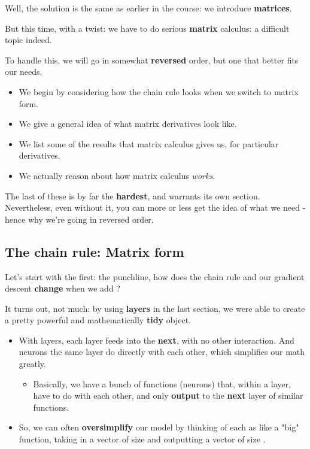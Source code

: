         Well, the solution is the same as earlier in the course: we introduce \textbf{matrices}.
        
        But this time, with a twist: we have to do serious \textbf{matrix} calculus: a difficult topic indeed.
        
        To handle this, we will go in somewhat \textbf{reversed} order, but one that better fits our needs.
        
        \begin{itemize}
            \item We begin by considering how the chain rule looks when we switch to matrix form.
            \item We give a general idea of what matrix derivatives look like.
            \item We list some of the results that matrix calculus gives us, for particular derivatives.
            \item We actually reason about how matrix calculus \textit{works}.
        \end{itemize}
        
        The last of these is by far the \textbf{hardest}, and warrants its own section. Nevertheless, even without it, you can more or less get the idea of what we need - hence why we're going in reversed order.

    \secdiv
    
    \subsection{The chain rule: Matrix form}
    
        Let's start with the first: the punchline, how does the chain rule and our gradient descent \textbf{change} when we add ?
        
        It turns out, not much: by using \textbf{layers} in the last section, we were able to create a pretty powerful and mathematically \textbf{tidy} object.

        \begin{itemize}
            \item With layers, each layer feeds into the \textbf{next}, with no other interaction. And neurons  the same layer do  directly  with each other, which simplifies our math greatly.

            \begin{itemize}
                \item Basically, we have a bunch of functions (neurons) that, within a layer, have  to do with each other, and only \textbf{output} to the \textbf{next} layer of similar functions. 
            \end{itemize}

            
            
            \item So, we can often \textbf{oversimplify} our model by thinking of each  as like a "big" function, taking in a vector of size  and outputting a vector of size . 
        \end{itemize}
        
